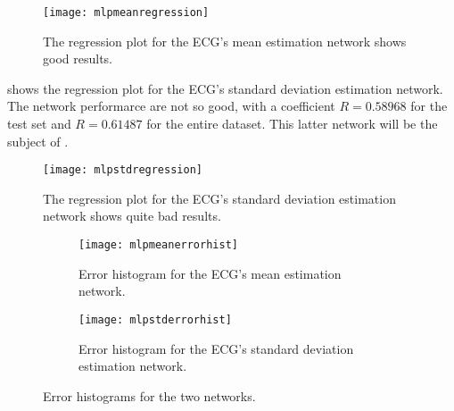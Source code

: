 \begin{figure}[htbp]
	\centering
	\texttt{[image: mlpmeanregression]}
	\caption{The regression plot for the ECG's mean estimation network
	shows good results.}\label{fig:mlpmeanregression}
\end{figure}

 shows the regression plot for the ECG's standard
deviation estimation network. The network performarce are not so good, with a
coefficient \(R = 0.58968\) for the test set and \(R = 0.61487\) for the entire
dataset. This latter network will be the subject of .

\begin{figure}[htbp]
	\centering
	\texttt{[image: mlpstdregression]}
	\caption{The regression plot for the ECG's standard deviation
	estimation network shows quite bad
	results.}\label{fig:mlpstdregression}
\end{figure}

\begin{figure}[htbp]
	\centering
	\begin{subfigure}{\textwidth}
		\centering
		\texttt{[image: mlpmeanerrorhist]}
		\caption{Error histogram for the ECG's mean estimation
		network.}\label{fig:mlpmeanerrorhist}
	\end{subfigure}
	\begin{subfigure}{\textwidth}
		\centering
		\texttt{[image: mlpstderrorhist]}
		\caption{Error histogram for the ECG's standard deviation
		estimation network.}\label{fig:mlpstderrorhist}
	\end{subfigure}
	\caption{Error histograms for the two
	networks.}\label{fig:mlperrorhists}
\end{figure}
